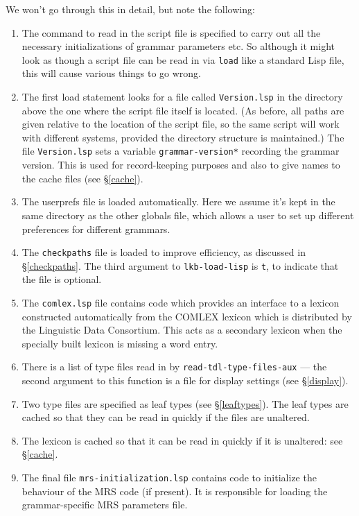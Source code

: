 \documentclass[12pt]{report}
\newcommand{\filename}[1]{{\tt #1}}
\newcommand{\functionname}[1]{{\tt #1}}
\newcommand{\lkbparam}[1]{{\tt #1}}
\begin{document}
We won't go through this in detail, but
note the following:
\begin{enumerate}
\item The command to read in the script file is specified
to carry out all the necessary initializations of grammar parameters
etc.  So although it might look as though a script file can
be read in via \functionname{load} like a standard Lisp file, this will
cause various things to go wrong.
\item The first load statement looks for a file called \filename{Version.lsp}
in the directory above the one where the script file itself is located.
(As before, all paths are given relative to the location of the
script file, so the same script will work with different
systems, provided the directory structure is maintained.)
The file \filename{Version.lsp}
sets a variable \lkbparam{*grammar-version*} 
recording the grammar version.  This is used for 
record-keeping purposes and also to give names to the 
cache files (see \S\ref{cache}).
\item The userprefs file is loaded automatically.  Here we assume it's
kept in the same directory as the other globals file, which allows
a user to set up different preferences for different grammars.
\item The \filename{checkpaths} file is loaded to improve efficiency,
as discussed in \S\ref{checkpaths}.  The third argument to 
\functionname{lkb-load-lisp} is {\tt t}, to indicate that the file is optional.
\item The \filename{comlex.lsp} file contains code which provides an
interface to a lexicon constructed automatically from the COMLEX lexicon
which is distributed by the Linguistic Data Consortium. 
This acts as a secondary lexicon when the specially built lexicon
is missing a word entry.
\item There is a list of type files read in by 
\functionname{read-tdl-type-files-aux}
--- the second argument to this function is a file for
display settings (see \S\ref{display}).
\item Two type files are specified as leaf types (see \S\ref{leaftypes}).
The leaf types are cached so that they can be read in quickly if the
files are unaltered.
\item The lexicon is cached so that it can be read in quickly if it is
unaltered: see \S\ref{cache}.
\item The final file \filename{mrs-initialization.lsp}
contains code to initialize the
behaviour of the MRS code (if present).  It is responsible for loading the
grammar-specific MRS parameters file.
\end{enumerate}
\end{document}
